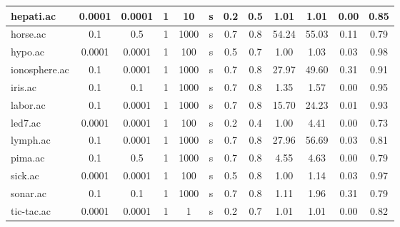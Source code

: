 \begin{table}[htbp]
\begin{tabular}{|l|c|c|c|c|c|c|c||c|c|c|c|}
		\hline
		hepati.ac      & 0.0001   & 0.0001      & 1              & 10                  & s        & 0.2    & 0.5   & 1.01           & 1.01           & 0.00           & 0.85           \\
		\hline
		horse.ac       & 0.1      & 0.5         & 1              & 1000                & s        & 0.7    & 0.8   & 54.24          & 55.03          & 0.11           & 0.79           \\
		\hline
		hypo.ac        & 0.0001   & 0.0001      & 1              & 100                 & s        & 0.5    & 0.7   & 1.00           & 1.03           & 0.03           & 0.98           \\
		\hline
		ionosphere.ac  & 0.1      & 0.0001      & 1              & 1000                & s        & 0.7    & 0.8   & 27.97          & 49.60          & 0.31           & 0.91           \\
		\hline
		iris.ac        & 0.1      & 0.1         & 1              & 1000                & s        & 0.7    & 0.8   & 1.35           & 1.57           & 0.00           & 0.95           \\
		\hline
		labor.ac       & 0.1      & 0.0001      & 1              & 1000                & s        & 0.7    & 0.8   & 15.70          & 24.23          & 0.01           & 0.93           \\
		\hline
		led7.ac        & 0.0001   & 0.0001      & 1              & 100                 & s        & 0.2    & 0.4   & 1.00           & 4.41           & 0.00           & 0.73           \\
		\hline
		lymph.ac       & 0.1      & 0.0001      & 1              & 1000                & s        & 0.7    & 0.8   & 27.96          & 56.69          & 0.03           & 0.81           \\
		\hline
		pima.ac        & 0.1      & 0.5         & 1              & 1000                & s        & 0.7    & 0.8   & 4.55           & 4.63           & 0.00           & 0.79           \\
		\hline
		sick.ac        & 0.0001   & 0.0001      & 1              & 100                 & s        & 0.5    & 0.8   & 1.00           & 1.14           & 0.03           & 0.97           \\
		\hline
		sonar.ac       & 0.1      & 0.1         & 1              & 1000                & s        & 0.7    & 0.8   & 1.11           & 1.96           & 0.31           & 0.79           \\
		\hline
		tic-tac.ac     & 0.0001   & 0.0001      & 1              & 1                   & s        & 0.2    & 0.7   & 1.01           & 1.01           & 0.00           & 0.82           \\

\end{tabular}
\end{table}
